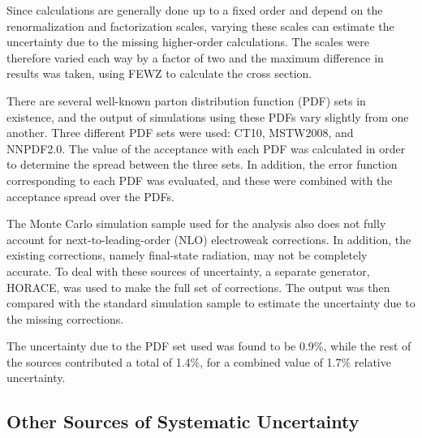 
Since calculations are generally done up to a fixed order 
and depend on the renormalization and factorization scales, %
varying these scales can estimate the uncertainty due 
to the missing higher-order calculations.  
The scales were therefore varied each way by a factor of two 
and the maximum difference in results was taken, 
using FEWZ to calculate the cross section.  %



There are several well-known
parton distribution function (PDF) sets
in existence,
and the output of simulations
using these PDFs vary slightly from one another.
Three different PDF sets were used: 
CT10, MSTW2008, and NNPDF2.0.  
The value of the acceptance with each PDF was calculated 
in order to determine the spread between the three sets.  
In addition, the error function corresponding to each PDF 
was evaluated, 
and these were combined with the acceptance spread 
over the PDFs.  



The Monte Carlo simulation sample used for the analysis 
also does not fully account for next-to-leading-order (NLO) 
electroweak corrections.  
In addition, the existing corrections, 
namely final-state radiation, 
may not be completely accurate.  
To deal with these sources of uncertainty, 
a separate generator, HORACE, 
was used to make the full set of corrections.  
The output was then compared with the 
standard simulation sample to estimate 
the uncertainty due to the missing corrections.  



The uncertainty due to the PDF set used 
was found to be 0.9\%, 
while the rest of the sources 
contributed a total of 1.4\%, 
for a combined value of 1.7\% relative uncertainty.  





\subsection{Other Sources of Systematic Uncertainty}
\label{anMeth:SystsOther}

